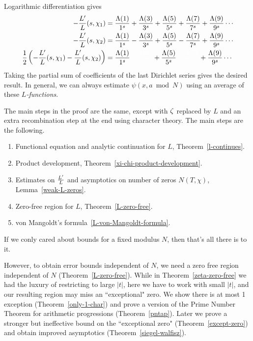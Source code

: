 Logarithmic differentiation gives
\begin{align*}
-\fc{L'}{L}(s,\chi_1)&=\frac{\La(1)}{1^s}+\frac{\La(3)}{3^s}+\frac{\La(5)}{5^s}+\frac{\La(7)}{7^s}+\frac{\La(9)}{9^s}\cdots\\
-\fc{L'}{L}(s,\chi_2)&=\frac{\La(1)}{1^s}-\frac{\La(3)}{3^s}+\frac{\La(5)}{5^s}-\frac{\La(7)}{7^s}+\frac{\La(9)}{9^s}\cdots\\
\rc2\pa{-\fc{L'}{L}(s,\chi_1)
-\fc{L'}{L}(s,\chi_2)}
&=\frac{\La(1)}{1^s}
{\color{white} \,+\, \frac{\La(3)}{3^s}}
+\frac{\La(5)}{5^s}
{\color{white} \,+\, \frac{\La(7)}{7^s}}
+ \frac{\La(9)}{9^s}\cdots
\end{align*}
Taking the partial sum of coefficients of the last Dirichlet series gives the desired result. 
In general, we can always estimate $\psi(x, a\bmod N)$ using an average of these {\it $L$-functions}.%

The main steps in the proof are the same, except with $\zeta$ replaced by $L$ and an extra recombination step at the end using character theory. The main steps are the following.
\begin{enumerate}
\item Functional equation and analytic continuation for $L$, Theorem~\ref{l-continues}.
\item Product development, Theorem~\ref{xi-chi-product-development}.
\item Estimates on $\frac{L'}{L}$ and asymptotics on number of zeros $N(T,\chi)$, Lemma~\ref{weak-L-zeros}.
\item Zero-free region for $L$, Theorem~\ref{L-zero-free}.
\item von Mangoldt's formula~\ref{L-von-Mangoldt-formula}.
\end{enumerate}
If we conly cared about bounds for a fixed modulus $N$, then that's all there is to it.

However, to obtain error bounds independent of $N$, we need a zero free region independent of $N$ (Theorem~\ref{L-zero-free}). While in Theorem~\ref{zeta-zero-free} we had the luxury of restricting to large $|t|$, here we have to work with small $|t|$, and our resulting region may miss an ``exceptional" zero. We show there is at most 1 exception (Theorem~\ref{only-1-char}) and prove a version of the Prime Number Theorem for arithmetic progressions (Theorem~\ref{pntap}). Later we prove a stronger but ineffective bound on the ``exceptional zero" (Theorem~\ref{except-zero}) and obtain improved asymptotics (Theorem~\ref{siegel-walfisz}).

